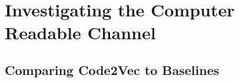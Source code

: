 





\section{Investigating the Computer Readable Channel} %
\label{sec:investigating_the_computer_channel}

\subsection{Comparing Code2Vec to Baselines} %
\label{sub:comparing_code2vec_to_baselines}


